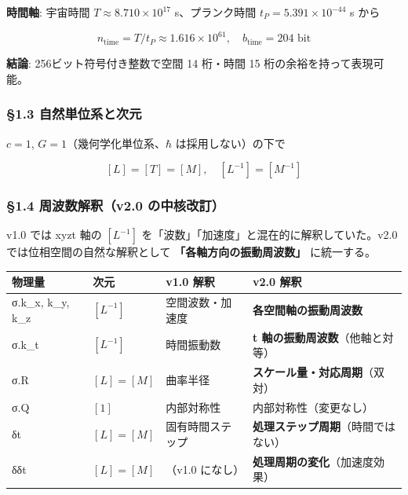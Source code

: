\documentclass[a4paper,11pt]{ltjsarticle}
\newcounter{none}
\begin{document}
\textbf{時間軸}: 宇宙時間 \(T \approx 8.710 \times 10^{17}\)
s、プランク時間 \(t_P = 5.391 \times 10^{-44}\) s から

\[n_{\text{time}} = T / t_P \approx 1.616 \times 10^{61}, \quad b_{\text{time}} = 204 \text{ bit}\]

\textbf{結論}: 256ビット符号付き整数で空間 14 桁・時間 15
桁の余裕を持って表現可能。

\subsubsection{§1.3
自然単位系と次元}\label{ux81eaux7136ux5358ux4f4dux7cfbux3068ux6b21ux5143}

\(c = 1\), \(G = 1\)（幾何学化単位系、\(\hbar\) は採用しない）の下で

\[[L] = [T] = [M], \quad [L^{-1}] = [M^{-1}]\]

\subsubsection{§1.4 周波数解釈（v2.0
の中核改訂）}\label{ux5468ux6ce2ux6570ux89e3ux91c8v2.0-ux306eux4e2dux6838ux6539ux8a02}

v1.0 では xyzt 軸の \([L^{-1}]\)
を「波数」「加速度」と混在的に解釈していた。v2.0
では位相空間の自然な解釈として \textbf{「各軸方向の振動周波数」}
に統一する。

{\def\LTcaptype{none} %
\begin{longtable}[]{@{}
  >{\raggedright\arraybackslash}p{}
  >{\raggedright\arraybackslash}p{}
  >{\raggedright\arraybackslash}p{}
  >{\raggedright\arraybackslash}p{}@{}}
\toprule\noalign{}
\begin{minipage}[b]{\linewidth}\raggedright
物理量
\end{minipage} & \begin{minipage}[b]{\linewidth}\raggedright
次元
\end{minipage} & \begin{minipage}[b]{\linewidth}\raggedright
v1.0 解釈
\end{minipage} & \begin{minipage}[b]{\linewidth}\raggedright
\textbf{v2.0 解釈}
\end{minipage} \\
\midrule\noalign{}
\endhead
\bottomrule\noalign{}
\endlastfoot
σ.k\_x, k\_y, k\_z & \([L^{-1}]\) & 空間波数・加速度 &
\textbf{各空間軸の振動周波数} \\
σ.k\_t & \([L^{-1}]\) & 時間振動数 & \textbf{t
軸の振動周波数}（他軸と対等） \\
σ.R & \([L]=[M]\) & 曲率半径 & \textbf{スケール量・対応周期}（双対） \\
σ.Q & \([1]\) & 内部対称性 & 内部対称性（変更なし） \\
δt & \([L]=[M]\) & 固有時間ステップ &
\textbf{処理ステップ周期}（時間ではない） \\
δδt & \([L]=[M]\) & （v1.0 になし） &
\textbf{処理周期の変化}（加速度効果） \\
\end{longtable}
}
\end{document}
